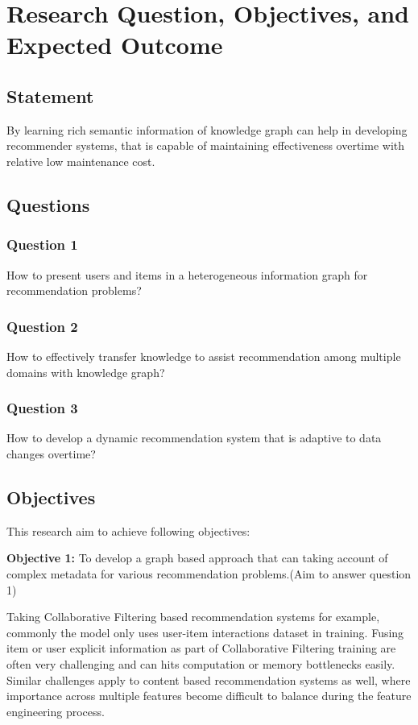 
\section{Research Question, Objectives, and Expected Outcome}

\subsection{Statement}
By learning rich semantic information of knowledge graph can help in developing recommender systems, that is capable of maintaining effectiveness overtime with relative low maintenance cost. 

\subsection{Questions}

\subsubsection*{Question 1}
How to present users and items in a heterogeneous information graph for recommendation problems?

\subsubsection*{Question 2}
How to effectively transfer knowledge to assist recommendation among multiple domains with knowledge graph?

\subsubsection*{Question 3}
How to develop a dynamic recommendation system that is adaptive to data changes overtime?

\subsection{Objectives}
This research aim to achieve following objectives: 

\bigskip
\textbf{Objective 1:} To develop a graph based approach that can taking account of complex metadata for various recommendation problems.(Aim to answer question 1)

Taking Collaborative Filtering based recommendation systems for example, commonly the model only uses user-item interactions dataset in training. Fusing item or user explicit information as part of Collaborative Filtering training are often very challenging and can hits computation or memory bottlenecks easily. Similar challenges apply to content based recommendation systems as well, where importance across multiple features become difficult to balance during the feature engineering process.

